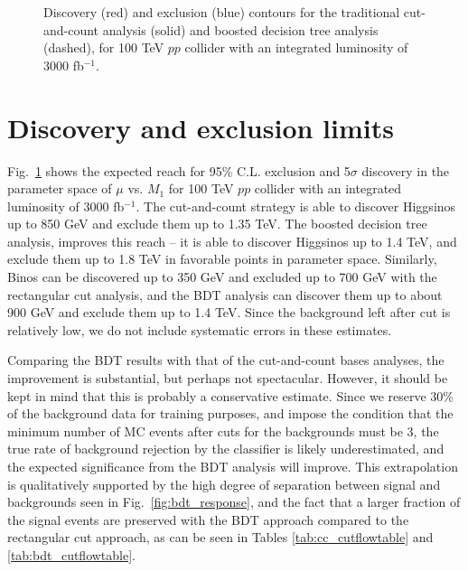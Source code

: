 \documentclass[a4paper,11pt]{article}
\begin{document}
\begin{figure}[h]
\centering


\caption{ Discovery (red) and exclusion (blue) contours for the traditional
  cut-and-count analysis (solid) and boosted decision tree analysis (dashed),
  for 100 TeV $pp$ collider with an integrated luminosity of 3000 fb$^{-1}$.
}

\label{fig:contours}
\end{figure}

\section{Discovery and exclusion limits}
\label{sec:results}

Fig.~\ref{fig:contours} shows the expected reach  for 95\% C.L. exclusion and
5$\sigma$ discovery in the parameter space of $\mu$ vs.  $M_1$ for 100 TeV $pp$
collider with an integrated luminosity of 3000 fb$^{-1}$. The cut-and-count
strategy is able to discover Higgsinos up to 850 GeV  and exclude them up to
1.35 TeV.  The boosted decision
tree analysis, improves this reach -- it is able to discover Higgsinos up to
1.4 TeV, and exclude them up to 1.8 TeV in favorable points in parameter space.
Similarly, Binos can be discovered up to 350 GeV and excluded up to 700 GeV
with the rectangular cut analysis, and the BDT analysis can discover them up to
about 900 GeV and exclude them up to 1.4 TeV. Since the background left after
cut is relatively low, we do not include systematic errors in these estimates.  


Comparing the BDT results with that of the cut-and-count bases analyses, the improvement is substantial, but perhaps not spectacular. However, it should
be kept in mind that this is probably a conservative estimate. Since we reserve
30\% of the background data for training purposes, and impose the condition that the
minimum number of MC events after cuts for the backgrounds must be 3, the true rate of background
rejection by the classifier is likely underestimated, and the expected
significance from the BDT analysis will improve. This extrapolation is
qualitatively supported by the high degree of separation between signal and
backgrounds seen in Fig.~\ref{fig:bdt_response}, and the fact that a larger
fraction of the signal events are preserved with the BDT approach compared to
the rectangular cut approach, as can be seen in Tables \ref{tab:cc_cutflowtable}
and \ref{tab:bdt_cutflowtable}.  
\end{document}
